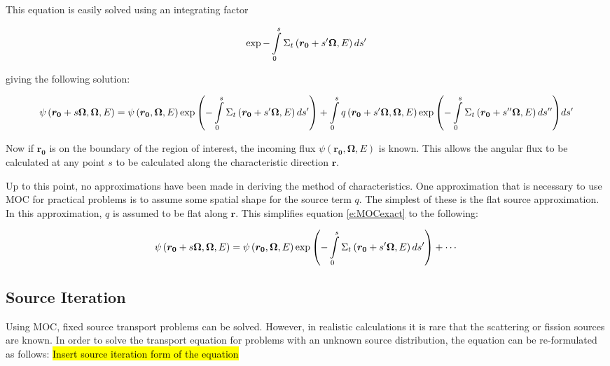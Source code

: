 {This equation is easily solved using an integrating factor

\begin{equation}
\exp{-\intop_0^s \Sigma_t\left(\bm {r_0} + s'\bm\Omega,E\right)ds'}
\end{equation}

giving the following solution:

\begin{dmath}\label{e:MOCexact}
{\psi\left(\bm {r_0} + s\bm\Omega,\bm\Omega,E\right) = \psi\left(\bm {r_0},\bm\Omega,E\right)\exp{\left(-\intop_0^s \Sigma_t\left(\bm {r_0} + s'\bm\Omega,E\right)ds'\right)}} + {\intop_0^s q\left(\bm {r_0} + s'\bm\Omega,\bm\Omega, E\right)\exp{\left(-\intop_0^s \Sigma_t\left(\bm {r_0} + s''\bm\Omega,E\right)ds''\right)}ds'}
\end{dmath}

Now if $\bm {r_0}$ is on the boundary of the region of interest, the incoming flux $\psi\left(\bm {r_0},\bm \Omega, E\right)$ is known.  This allows the angular flux to be calculated at any point $s$ to be calculated along the characteristic direction $\bm r$.

Up to this point, no approximations have been made in deriving the method of characteristics.  One approximation that is necessary to use MOC for practical problems is to assume some spatial shape for the source term $q$.  The simplest of these is the flat source approximation.  In this approximation, $q$ is assumed to be flat along $\bm r$.  This simplifies equation \ref{e:MOCexact} to the following:

\begin{dmath}\label{e:MOCflatsource}
\psi\left(\bm {r_0} + s\bm\Omega,\bm\Omega,E\right) = \psi\left(\bm {r_0},\bm\Omega,E\right)\exp{\left(-\intop_0^s \Sigma_t\left(\bm {r_0} + s'\bm\Omega,E\right)ds'\right)} + \cdots
\end{dmath}

\subsection{Source Iteration}

Using MOC, fixed source transport problems can be solved.  However, in realistic calculations it is rare that the scattering or fission sources are known.  In order to solve the transport equation for problems with an unknown source distribution, the equation can be re-formulated as follows:
\hl{Insert source iteration form of the equation}

}
